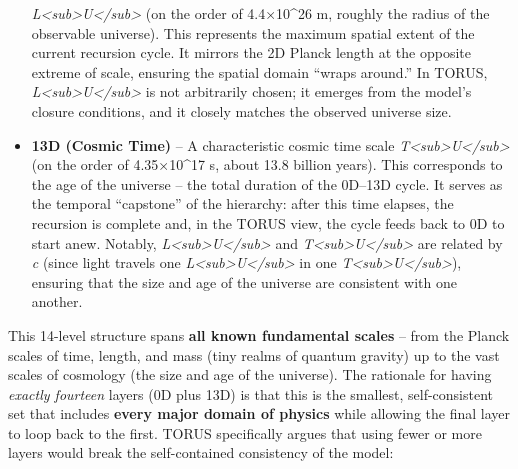 \documentclass[
]{article}
\begin{document}
\begin{itemize}
  \emph{L\textless sub\textgreater U\textless/sub\textgreater{}} (on the
  order of 4.4×10\^{}26 m, roughly the radius of the observable
  universe)\hspace{0pt}. This represents the maximum spatial extent of
  the current recursion cycle. It mirrors the 2D Planck length at the
  opposite extreme of scale, ensuring the spatial domain ``wraps
  around.'' In TORUS,
  \emph{L\textless sub\textgreater U\textless/sub\textgreater{}} is not
  arbitrarily chosen; it emerges from the model's closure conditions,
  and it closely matches the observed universe size.
\item
  \textbf{13D (Cosmic Time)} -- A characteristic cosmic time scale
  \emph{T\textless sub\textgreater U\textless/sub\textgreater{}} (on the
  order of 4.35×10\^{}17 s, about 13.8 billion years)\hspace{0pt}. This
  corresponds to the age of the universe -- the total duration of the
  0D--13D cycle. It serves as the temporal ``capstone'' of the
  hierarchy: after this time elapses, the recursion is complete and, in
  the TORUS view, the cycle feeds back to 0D to start anew. Notably,
  \emph{L\textless sub\textgreater U\textless/sub\textgreater{}} and
  \emph{T\textless sub\textgreater U\textless/sub\textgreater{}} are
  related by \emph{c} (since light travels one
  \emph{L\textless sub\textgreater U\textless/sub\textgreater{}} in one
  \emph{T\textless sub\textgreater U\textless/sub\textgreater{}}),
  ensuring that the size and age of the universe are consistent with one
  another\hspace{0pt}.
\end{itemize}

This 14-level structure spans \textbf{all known fundamental scales} --
from the Planck scales of time, length, and mass (tiny realms of quantum
gravity) up to the vast scales of cosmology (the size and age of the
universe)\hspace{0pt}. The rationale for having \emph{exactly fourteen}
layers (0D plus 13D) is that this is the smallest, self-consistent set
that includes \textbf{every major domain of physics} while allowing the
final layer to loop back to the first. TORUS specifically argues that
using fewer or more layers would break the self-contained consistency of
the model:
\end{document}
